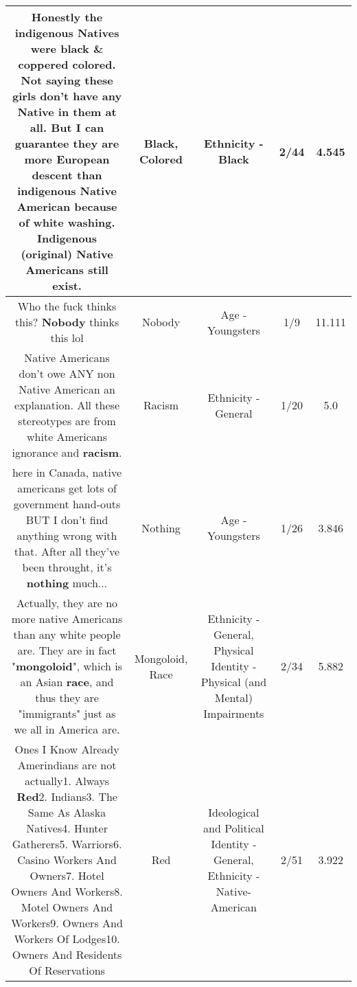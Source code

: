 \documentclass[11pt]{article}
\newlength\mylength
\begin{document}
\begin{center}
\begin{longtable}{|C{.65\mylength}|C{.30\mylength}|C{.12\mylength}|C{.12\mylength}|C{.12\mylength}|}
  \small Honestly the indigenous Natives were \textbf{black} \& coppered \textbf{colored}. Not saying these girls don't have any Native in them at all. But I can guarantee they are more European descent than indigenous Native American because of white washing. Indigenous (original) Native Americans still exist.\normalsize   & Black, Colored & Ethnicity - Black & 2/44 & 4.545 \\  \hline
  \small Who the fuck thinks this? \textbf{Nobody} thinks this lol\normalsize   & Nobody & Age - Youngsters & 1/9 & 11.111 \\  \hline
  \small Native Americans don't owe ANY non Native American an explanation. All these stereotypes are from white Americans ignorance and \textbf{racism}.\normalsize   & Racism & Ethnicity - General & 1/20 & 5.0 \\  \hline
  \small here in Canada, native americans get lots of government hand-outs BUT I don't find anything wrong with that. After all they've been throught, it's \textbf{nothing} much...\normalsize   & Nothing & Age - Youngsters & 1/26 & 3.846 \\  \hline
  \small Actually, they are no more native Americans than any white people are.  They are in fact "\textbf{mongoloid}", which is an Asian \textbf{race}, and thus they are "immigrants" just as we all in America are.\normalsize   & Mongoloid, Race & Ethnicity - General, Physical Identity - Physical (and Mental) Impairments & 2/34 & 5.882 \\  \hline
  \small Ones I Know Already Amerindians are not actually1. Always \textbf{R\textbf{ed}}2. Indians3. The Same As Alaska Natives4. Hunter Gatherers5. Warriors6. Casino Workers And Owners7. Hotel Owners And Workers8. Motel Owners And Workers9. Owners And Workers Of Lodges10. Owners And Residents Of Reservations\normalsize   & Red &  Ideological and Political Identity - General, Ethnicity - Native-American & 2/51 & 3.922 \\  \hline

\end{longtable}
\end{center}
\end{document}
